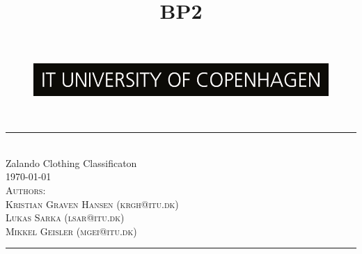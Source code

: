\title{BP2}
\begin{titlepage}
\centering
\newcommand{\HLine}{\rule{\linewidth}{0.5mm}}

\begin{figure}[h]
\centering
\includegraphics[width=12cm]{reports/figures_for_report/ITU_logo.png}
\end{figure}
\hfill \break
\hfill \break
\textsc{\Large}\\
\HLine \\[0.5cm]
\huge Zalando Clothing Classificaton \\
\small{\today}\\
\vspace*{.5cm}
\textsc{\large Authors:
\\Kristian Graven Hansen (krgh@itu.dk)
\\Lukas Sarka (lsar@itu.dk)
\\Mikkel Geisler (mgei@itu.dk)}\\[0.5cm]
\HLine

\begin{minipage}{0.45\textwidth}
\begin{flushleft} \large
\end{flushleft}
\end{minipage}
\begin{minipage}{0.5\textwidth}
\begin{flushright} \large
\end{flushright}
\end{minipage}
\vfill
\end{titlepage}
\pagebreak